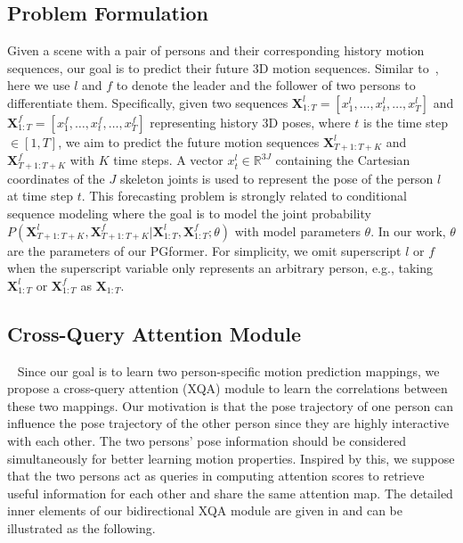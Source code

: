 \documentclass[10pt,twocolumn,letterpaper]{article}
\begin{document}
\subsection{Problem Formulation} 
Given a scene with a pair of persons and their corresponding history motion sequences, our goal is to predict their future 3D motion sequences. 
Similar to~\cite{guo2021multi}, here we use $l$ and $f$ to denote the leader and the follower of two persons to differentiate them. 
Specifically, given two sequences $\bm{X}^{l}_{1:T}=[x^{l}_1, \dots, x^{l}_t, \dots, x^{l}_T]$ and $\bm{X}^{f}_{1:T}=[x^{f}_1, \dots, x^{f}_t, \dots, x^{f}_T]$ representing history 3D poses, where $t$ is the time step $\in [1, T]$, we aim to predict the future motion sequences $\bm{X}^{l}_{T+1:T+K}$ and $\bm{X}^{f}_{T+1:T+K}$ with $K$ time steps. 
A vector $x^{l}_t \in \mathbb{R}^{3J}$ containing the Cartesian coordinates of the $J$ skeleton joints is used to represent the pose of the person $l$ at time step $t$. 
This forecasting problem is strongly related to conditional sequence modeling where the goal is to model
the joint probability $P(\bm{X}^{l}_{T+1:T+K}, \bm{X}^{f}_{T+1:T+K}|\bm{X}^{l}_{1:T}, \bm{X}^{f}_{1:T}; \theta)$ with model parameters $\theta$. 
In our work, $\theta$ are the parameters of our PGformer.
For simplicity, we omit superscript $l$ or $f$ when the superscript variable only represents an arbitrary person, e.g., taking $\bm{X}^{l}_{1:T}$ or $\bm{X}^{f}_{1:T}$ as $\bm{X}_{1:T}$.


\subsection{Cross-Query Attention Module}
~\label{subsec:xqa_module}
Since our goal is to learn two person-specific motion prediction mappings, we propose a cross-query attention (XQA) module to learn the correlations between these two mappings.
Our motivation is that the pose trajectory of one person can influence the pose trajectory of the other person since they are highly interactive with each other.
The two persons' pose information should be considered simultaneously for better learning motion properties.
Inspired by this, we suppose that the two persons act as queries in computing attention scores to retrieve useful information for each other and share the same attention map. 
The detailed inner elements of our bidirectional XQA module are given in  and can be illustrated as the following. 
\end{document}
